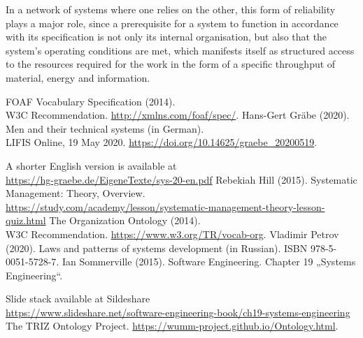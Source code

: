 \documentclass[11pt,a4paper]{article}
\begin{document}
In a network of systems where one relies on the other, this form of
reliability plays a major role, since a prerequisite for a system to function
in accordance with its specification is not only its internal organisation,
but also that the system's operating conditions are met, which manifests
itself as structured access to the resources required for the work in the form
of a specific throughput of material, energy and information.

\begin{thebibliography}{xxx}

 FOAF Vocabulary Specification (2014).\\ W3C Recommendation.
  \url{http://xmlns.com/foaf/spec/}.
 Hans-Gert Gräbe (2020). Men and their technical systems
  (in German).\\ LIFIS Online, 19 May 2020.
  \url{https://doi.org/10.14625/graebe_20200519}.

  A shorter English version is available at\\
  \url{https://hg-graebe.de/EigeneTexte/sys-20-en.pdf}
 Rebekiah Hill (2015).  Systematic Management: Theory,
  Overview.\\{\small
  \url{https://study.com/academy/lesson/systematic-management-theory-lesson-quiz.html}}
 The Organization Ontology (2014).\\  W3C Recommendation.
  \url{https://www.w3.org/TR/vocab-org}.
 Vladimir Petrov (2020). Laws and patterns of systems
  development (in Russian). ISBN 978-5-0051-5728-7.
 Ian Sommerville (2015). Software Engineering.
  Chapter 19 „Systems Engineering“.

  Slide stack available at Sildeshare\\{\small
  \url{https://www.slideshare.net/software-engineering-book/ch19-systems-engineering}   }
 The TRIZ Ontology Project.
  \url{https://wumm-project.github.io/Ontology.html}.
\end{thebibliography}
\end{document}
